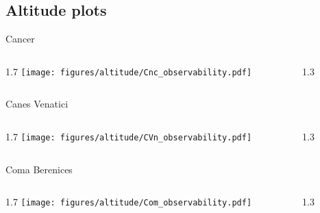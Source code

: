 \documentclass[final]{beamer}
\newlength{\colwidth}
\begin{document}
\subsection{Altitude plots}

\begin{frame}[t]{}

  \Large{Cancer}
  \begin{columns}[T]
    \begin{column}{1.7\colwidth}
      \centering
      \texttt{[image: figures/altitude/Cnc\_observability.pdf]}
    \end{column}
    \begin{column}{1.3\colwidth}
      \Large
      
    \end{column}
  \end{columns}

  \Large{Canes Venatici}
  \begin{columns}[T]
    \begin{column}{1.7\colwidth}
      \centering
      \texttt{[image: figures/altitude/CVn\_observability.pdf]}
    \end{column}
    \begin{column}{1.3\colwidth}
      \Large
      
    \end{column}
  \end{columns}

  \Large{Coma Berenices}
  \begin{columns}[T]
    \begin{column}{1.7\colwidth}
      \centering
      \texttt{[image: figures/altitude/Com\_observability.pdf]}
    \end{column}
    \begin{column}{1.3\colwidth}
      \Large
      
    \end{column}
  \end{columns}
\end{frame}

\end{document}
